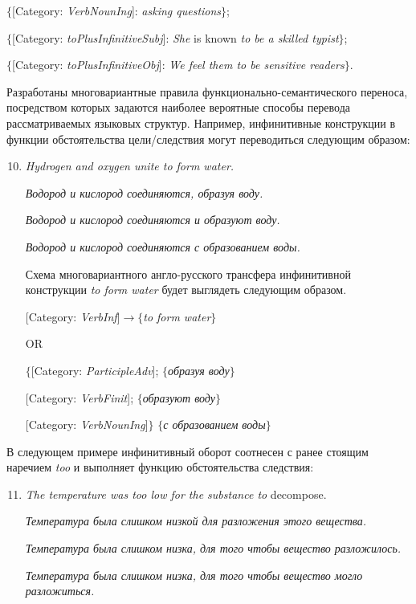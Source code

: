 \begin{multicols}{2}
\noindent
$\{$[Category: \textit{VerbNounIng}]: \textit{asking questions}$\}$;

\noindent
$\{$[Category: \textit{toPlusInfinitiveSubj}]: \textit{She} is known \textit{to be a
skilled typist}$\}$;

\noindent
$\{$[Category: \textit{toPlusInfinitiveObj}]: \textit{We feel them to be sensitive
readers}$\}$.

Разработаны многовариантные правила 
функ\-цио\-наль\-но-се\-ман\-ти\-че\-ско\-го переноса, посредством которых 
задаются наиболее вероятные способы перевода рассматриваемых языковых структур. 
Например,  инфинитивные конструкции в функции обстоятельства цели/следствия 
могут переводиться следующим  образом:
\begin{enumerate}[(1)]
\setcounter{enumi}{9}
\item \textit{Hydrogen and oxygen unite to form water.}

\textit{Водород и кислород соединяются, образуя воду.}

\textit{Водород и кислород соединяются и образуют воду.}

\textit{Водород и кислород соединяются с образованием воды.}

Схема многовариантного англо-русского трансфера инфинитивной
конструкции \textit{to form water} будет выглядеть следующим образом.

[Category: \textit{VerbInf}]\;$\rightarrow$\;$\{$\textit{to form water}$\}$

OR

$\{$[Category: \textit{ParticipleAdv}]; $\{$\textit{образуя воду}$\}$

[Category: \textit{VerbFinit}]; $\{$\textit{образуют воду}$\}$

[Category: \textit{VerbNounIng}]$\}$ $\{$\textit{с образованием
воды}$\}$
\end{enumerate}

В следующем примере инфинитивный оборот соотнесен с ранее стоящим наречием 
\textit{too} и выполняет функцию обстоятельства следствия:
\begin{enumerate}[(1)]
\setcounter{enumi}{10}
\item \textit{The temperature was too low for the substance to}
decompose.

\textit{Температура была слишком низкой для разложения этого
вещества.}

\textit{Температура была слишком низка, для того чтобы вещество
разложилось.}

\textit{Температура была слишком низка, для того чтобы вещество
могло разложиться.}


\end{enumerate}
\end{multicols}
